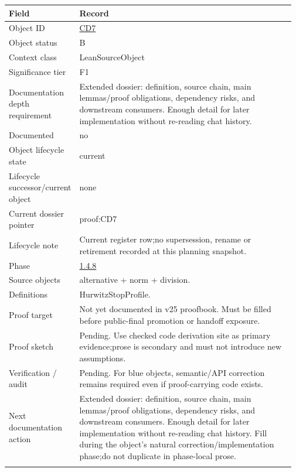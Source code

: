 \begin{longtable}{L{0.16\linewidth} L{0.81\linewidth}}
\hline
\textbf{Field} & \textbf{Record}\\
\hline
Object ID & \hyperlink{object-row-CD7}{CD7}\\
\hline\addlinespace[0.20em]
Object status & B\\
\hline\addlinespace[0.20em]
Context class & LeanSourceObject\\
\hline\addlinespace[0.20em]
Significance tier & F1\\
\hline\addlinespace[0.20em]
Documentation depth requirement & Extended dossier: definition, source chain, main lemmas/\allowbreak{}proof obligations, dependency risks, and downstream consumers. Enough detail for later implementation without re-reading chat history.\\
\hline\addlinespace[0.20em]
Documented & no\\
\hline\addlinespace[0.20em]
Object lifecycle state & current\\
\hline\addlinespace[0.20em]
Lifecycle successor/\allowbreak{}current object & none\\
\hline\addlinespace[0.20em]
Current dossier pointer & proof:CD7\\
\hline\addlinespace[0.20em]
Lifecycle note & Current register row;\newline no supersession, rename or retirement recorded at this planning snapshot.\\
\hline\addlinespace[0.20em]
Phase & \hyperlink{phase-row-1-4-8}{1.4.8}\\
\hline\addlinespace[0.20em]
Source objects & alternative + norm + division.\\
\hline\addlinespace[0.20em]
Definitions & HurwitzStopProfile.\\
\hline\addlinespace[0.20em]
Proof target & Not yet documented in v25 proofbook. Must be filled before public-final promotion or handoff exposure.\\
\hline\addlinespace[0.20em]
Proof sketch & Pending. Use checked code derivation site as primary evidence;\newline prose is secondary and must not introduce new assumptions.\\
\hline\addlinespace[0.20em]
Verification /\allowbreak{} audit & Pending. For blue objects, semantic/\allowbreak{}API correction remains required even if proof-carrying code exists.\\
\hline\addlinespace[0.20em]
Next documentation action & Extended dossier: definition, source chain, main lemmas/\allowbreak{}proof obligations, dependency risks, and downstream consumers. Enough detail for later implementation without re-reading chat history. Fill during the object's natural correction/\allowbreak{}implementation phase;\newline do not duplicate in phase-local prose.\\
\hline\addlinespace[0.20em]
\end{longtable}
